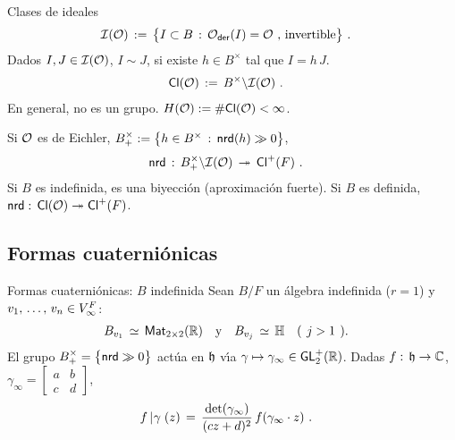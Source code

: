 \begin{frame}{Clases de ideales}
	\begin{align*}
		\ideales{\cal O} & \,:=\,\big\{I\subset B\,:\,
			\Oder(I)=\cal O	\text{ , invertible}\big\}
		\text{ .}
	\end{align*}
	Dados $I,J\in\ideales{\cal O}$, $I\sim J$, si existe $h\in B^\times$
	tal que $I=h\,J$.
	\begin{align*}
		\Class{\cal O} & \,:=\,B^\times\backslash\ideales{\cal O}
		\text{ .}
	\end{align*}
	En general, no es un grupo. $H(\cal O):=\#\Class{\cal O}<\infty$.
	\begin{teoNorma}\label{thm:norma}
		Si $\cal O$ es de Eichler,
		\begin{math}
			B_+^\times :=\big\{h\in B^\times\,:\,\nrd(h)\gg 0\big\}
		\end{math},
		\begin{align*}
			\nrd & \,:\,B^\times_+\backslash\ideales{\cal O}
				\,\twoheadrightarrow\,\pClass{F}
			\text{ .}
		\end{align*}
		Si $B$ es indefinida, es una biyecci\'{o}n (aproximaci\'{o}n
		fuerte). Si $B$ es definida,
		$\nrd:\,\Class{\cal O}\twoheadrightarrow\pClass F$.
	\end{teoNorma}
\end{frame}

\subsection{Formas cuaterni\'{o}nicas}\label{subsec:cuaternionicas}

\begin{frame}{Formas cuaterni\'{o}nicas: $B$ indefinida}
	Sean $B/F$ un \'{a}lgebra indefinida ($r=1$) y
	$v_1,\,\dots,\,v_n\in\lugares[\infty]F$:
	\begin{align*}
		B_{v_1}\,\simeq\,\MM[2\times 2](\bb R) & \quad\text{y}\quad
			B_{v_j}\,\simeq\,\bb H
			\quad\text{(\phantom)}j>1\text{\phantom().}
	\end{align*}
	El grupo $B^\times_+=\big\{\nrd\gg 0\big\}$ act\'{u}a en $\hP$ v\'{\i}a
	$\gamma\mapsto\gamma_\infty\in\GLtp[2](\bb R)$. Dadas
	$f:\,\hP\rightarrow\bb C$,
	\begin{math}
		\gamma_\infty=
			\left[\begin{smallmatrix}
				a & b \\ c & d
			\end{smallmatrix}\right]
	\end{math},
	\begin{align*}
		f\operadormatrices{\null}{\gamma}(z) & \,=\,
			\frac{\det(\gamma_\infty)}{(cz+d)^2}\,
				f(\gamma_\infty\cdot z)
		\text{ .}
	\end{align*}
\end{frame}


